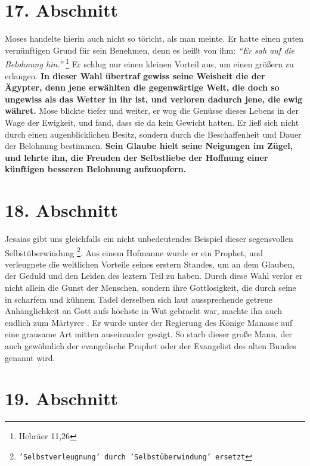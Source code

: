 \section{17. Abschnitt} \label{kap4_ab17}

\label{ref:04_17_mose}
Moses handelte hierin auch nicht so töricht, als man meinte. Er hatte einen
guten vernünftigen Grund für sein Benehmen, denn es heißt von ihm:
\textit{"`Er sah auf die Belohnung hin."'}
\footnote{Hebräer 11,26}
Er schlug nur einen kleinen
Vorteil aus, um einen größern zu erlangen. \textbf{In dieser Wahl übertraf
gewiss seine
Weisheit die der Ägypter, denn jene erwählten die gegenwärtige Welt, die doch so
ungewiss als das Wetter in ihr ist, und verloren dadurch jene, die ewig währet.}
Mose blickte tiefer und weiter, er wog die Genüsse dieses Lebens in der Wage der
Ewigkeit,  und fand, dass sie da kein Gewicht hatten. Er
ließ sich nicht durch
einen augenblicklichen Besitz, sondern durch die Beschaffenheit und Dauer der
Belohnung bestimmen. \textbf{Sein Glaube hielt seine Neigungen im Zügel, und
lehrte ihn,
die Freuden der Selbstliebe der Hoffnung einer künftigen besseren Belohnung
aufzuopfern.}

\section{18. Abschnitt} \label{kap4_ab18}

 Jesaias gibt uns gleichfalls ein nicht unbedeutendes
Beispiel dieser
segensvollen Selbstüberwindung \footnote{\texttt{'Selbstverleugnung' durch
'Selbstüberwindung' ersetzt}}. Aus einem Hofmanne wurde er ein Prophet, und
verleugnete die weltlichen Vorteile seines erstern Standes, um an dem Glauben,
der Geduld und den Leiden des leztern Teil zu haben. Durch diese Wahl verlor er
nicht allein die Gunst der Menschen, sondern ihre Gottlosigkeit, die durch seine
in scharfem und kühnem Tadel derselben sich laut aussprechende getreue
Anhänglichkeit an Gott aufs höchste in Wut gebracht war, machte ihn auch
endlich zum Märtyrer . Er wurde unter der Regierung des Könige
Manasse  auf eine
grausame Art mitten auseinander gesägt. So starb dieser große Mann, der auch
gewöhnlich der evangelische Prophet oder der Evangelist des alten
Bundes genannt wird.

\section{19. Abschnitt} \label{kap4_ab19}

